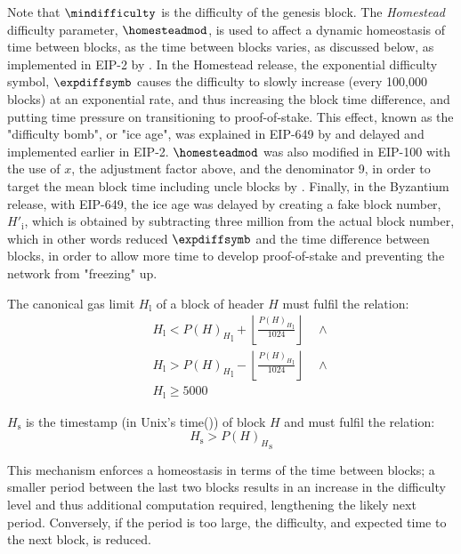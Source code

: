 \documentclass[9pt,oneside]{amsart}
\begin{document}
\begin{multicols}{2}
Note that $\mindifficulty$ is the difficulty of the genesis block. The \textit{Homestead} difficulty parameter, $\homesteadmod$, is used to affect a dynamic homeostasis of time between blocks, as the time between blocks varies, as discussed below, as implemented in EIP-2 by \cite{EIP-2}. In the Homestead release, the exponential difficulty symbol, $\expdiffsymb$ causes the difficulty to slowly increase (every 100,000 blocks) at an exponential rate, and thus increasing the block time difference, and putting time pressure on transitioning to proof-of-stake. This effect, known as the "difficulty bomb", or "ice age", was explained in EIP-649 by \cite{EIP-649} and delayed and implemented earlier in EIP-2. $\homesteadmod$ was also modified in EIP-100 with the use of $x$, the adjustment factor above, and the denominator 9, in order to target the mean block time including uncle blocks by \cite{EIP-100}. Finally, in the Byzantium release, with EIP-649, the ice age was delayed by creating a fake block number, $H'_{\mathrm{i}}$, which is obtained by subtracting three million from the actual block number, which in other words reduced $\expdiffsymb$ and the time difference between blocks, in order to allow more time to develop proof-of-stake and preventing the network from "freezing" up.

\hypertarget{block_gas_limit_H__l}{}The canonical gas limit $H_{\mathrm{l}}$ of a block of header $H$ must fulfil the relation:
\begin{eqnarray}
& & H_{\mathrm{l}} < {P(H)_{H}}_{\mathrm{l}} + \left\lfloor\frac{{P(H)_{H}}_{\mathrm{l}}}{1024}\right\rfloor \quad \wedge \\
\nonumber& & H_{\mathrm{l}} > {P(H)_{H}}_{\mathrm{l}} - \left\lfloor\frac{{P(H)_{H}}_{\mathrm{l}}}{1024}\right\rfloor \quad \wedge \\
\nonumber& & H_{\mathrm{l}} \geqslant 5000
\end{eqnarray}

\hypertarget{block_timestamp_H__s}{}$H_{\mathrm{s}}$ is the timestamp (in Unix's time()) of block $H$ and must fulfil the relation:
\begin{equation}
H_{\mathrm{s}} > {P(H)_{H}}_{\mathrm{s}}
\end{equation}

This mechanism enforces a homeostasis in terms of the time between blocks; a smaller period between the last two blocks results in an increase in the difficulty level and thus additional computation required, lengthening the likely next period. Conversely, if the period is too large, the difficulty, and expected time to the next block, is reduced.


\end{multicols}
\end{document}
